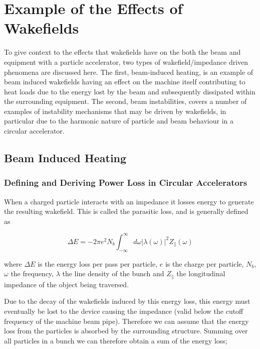 \section{Example of the Effects of Wakefields}

To give context to the effects that wakefields have on the both the beam and equipment with a particle accelerator, two types of wakefield/impedance driven phenomena are discussed here. The first, beam-induced heating, is an example of beam induced wakefields having an effect on the machine itself contributing to heat loads due to the energy lost by the beam and subsequently dissipated within the surrounding equipment. The second, beam instabilities, covers a number of examples of instability mechanisms that may be driven by wakefields, in particular due to the harmonic nature of particle and beam behaviour in a circular accelerator.

\subsection{Beam Induced Heating}
\label{sec:beam_induced_heating}
\subsubsection{Defining and Deriving Power Loss in Circular Accelerators}
\label{sec:power_loss}

When a charged particle interacts with an impedance it losses energy to generate the resulting wakefield. This is called the parasitic loss, and is generally defined as \cite{Chao:PhysColEff, Ng:IntDepInstab, }

\begin{equation}
\Delta E = -2\pi e^{2}N_{b}\int^{\infty}_{-\infty} d\omega \left| \lambda \left( \omega \right)  \right|^{2} Z_{\parallel} \left( \omega \right)
\end{equation}

where $\Delta E$ is the energy loss per pass per particle, $e$ is the charge per particle, $N_{b}$, $\omega$ the frequency, $\lambda$ the line density of the bunch and $Z_{\parallel}$ the longitudinal impedance of the object being traversed.
																
Due to the decay of the wakefields induced by this energy loss, this energy must eventually be lost to the device causing the impedance (valid below the cutoff frequency of the machine beam pipe). Therefore we can assume that the energy loss from the particles is absorbed by the surrounding structure. Summing over all particles in a bunch we can therefore obtain a sum of the energy loss;

